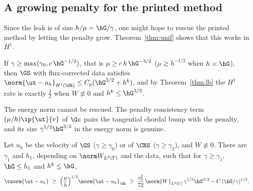 \subsection{A growing penalty for the printed method}\label{sec:growing}
Since the leak is of size $h/\mu=\hG/\gamma$, one might hope to rescue the printed method by letting the penalty grow. Theorem~\ref{thm:unif} shows that this works in $H^1$.

\begin{corollary}[Rescue in $H^1$]\label{cor:rescue}
If $\gamma\ge\max(\gamma_0,c\,\hG^{-1/2})$, that is $\mu\ge c\,h\,\hG^{-3/2}$ ($\mu\gtrsim h^{-1/2}$ when $h\asymp\hG$), then $\GS$ with flux-corrected data satisfies $\norm{\ut-u_h}_{H^1(\Oh)}\le C_p(\hG^{3/2}+h^k)$, and by Theorem~\ref{thm:lb} the $H^1$ rate is exactly $\frac32$ when $W\not\equiv0$ and $h^k\le\hG^{3/2}$.
\end{corollary}

The energy norm cannot be rescued. The penalty consistency term $(\mu/h)\ip{\ut}{v}$ of $\Gc$ pairs the tangential chordal bump with the penalty, and its size $\gamma^{1/2}\hG^{3/2}$ in the energy norm is genuine.

\begin{theorem}\label{thm:elower}
Let $u_h$ be the velocity of $\GS$ ($\gamma\ge\gamma_0$) or of $\CNS$ ($\gamma\ge\gamma_2$), and $W\not\equiv0$. There are $\gamma_1$ and $h_1$, depending on $\norm W_{L^2(\Gamma)}$ and the data, such that for $\gamma\ge\gamma_1$, $\hG\le h_1$ and $h^k\le\hG$,
\[
\tnorm{\ut-u_h}\ \ge\ \Bigl(\frac\mu h\Bigr)^{1/2}\norm{\ut-u_h}_{\Gh}\ \ge\ \frac{c_0^2}{72}\,\norm{W}_{L^2(\Gamma)}\,\gamma^{1/2}\hG^{3/2}-C\,(\hG/\gamma)^{1/2}.
\]
\end{theorem}

